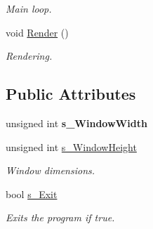 \begin{DoxyCompactItemize}
\begin{DoxyCompactList}\small\item\em Main loop. \item\end{DoxyCompactList}\item 
\hypertarget{struct_t_i_l_f_w_1_1_framework_ad780d90fcb7a69545efbe320dc12b726}{
void \hyperlink{struct_t_i_l_f_w_1_1_framework_ad780d90fcb7a69545efbe320dc12b726}{Render} ()}
\label{struct_t_i_l_f_w_1_1_framework_ad780d90fcb7a69545efbe320dc12b726}

\begin{DoxyCompactList}\small\item\em Rendering. \item\end{DoxyCompactList}\end{DoxyCompactItemize}
\subsection*{Public Attributes}
\begin{DoxyCompactItemize}
\item 
\hypertarget{struct_t_i_l_f_w_1_1_framework_acc2823b02dfe5b7fb775a7e5db3415d3}{
unsigned int {\bfseries s\_\-WindowWidth}}
\label{struct_t_i_l_f_w_1_1_framework_acc2823b02dfe5b7fb775a7e5db3415d3}

\item 
\hypertarget{struct_t_i_l_f_w_1_1_framework_af9e746ade44702026071be1ab910e90c}{
unsigned int \hyperlink{struct_t_i_l_f_w_1_1_framework_af9e746ade44702026071be1ab910e90c}{s\_\-WindowHeight}}
\label{struct_t_i_l_f_w_1_1_framework_af9e746ade44702026071be1ab910e90c}

\begin{DoxyCompactList}\small\item\em Window dimensions. \item\end{DoxyCompactList}\item 
\hypertarget{struct_t_i_l_f_w_1_1_framework_ad1b40fc088d50793b36eebe40eee12b7}{
bool \hyperlink{struct_t_i_l_f_w_1_1_framework_ad1b40fc088d50793b36eebe40eee12b7}{s\_\-Exit}}
\label{struct_t_i_l_f_w_1_1_framework_ad1b40fc088d50793b36eebe40eee12b7}

\begin{DoxyCompactList}\small\item\em Exits the program if true. \item\end{DoxyCompactList}\end{DoxyCompactItemize}
